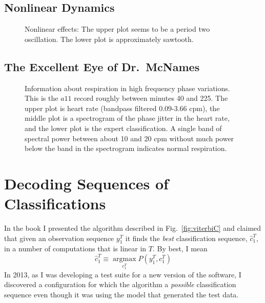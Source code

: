 \documentclass[prelim,showlabels]{book}
\newcommand{\argmax}{\operatorname*{argmax}}
\begin{document}
\addtocounter{subsection}{1}
\subsection{Nonlinear Dynamics}
\label{sec:NLD}

\begin{figure}
  \caption[Nonlinear effects]%
  {Nonlinear effects: The upper plot seems to be a period two
    oscillation.  The lower plot is approximately sawtooth.}
  \label{fig:ApneaNLD}
\end{figure}

\subsection{The Excellent Eye of Dr.\ McNames}
\label{sec:mcnames}

\begin{figure}
  \caption[Information about respiration in high
  frequency phase variations]%
  {Information about respiration in high frequency phase variations.
    This is the $a11$ record roughly between minutes 40 and 225.  The
    upper plot is heart rate (bandpass filtered 0.09-3.66 cpm), the
    middle plot is a spectrogram of the phase jitter in the heart
    rate, and the lower plot is the expert classification.  A single
    band of spectral power between about 10 and 20 cpm without much
    power below the band in the spectrogram indicates normal
    respiration.}
  \label{fig:sgram}
\end{figure}
\afterpage{\clearpage} %
\newpage
\section{Decoding Sequences of Classifications}
\label{sec:V4Class}

In the book I presented the algorithm described
in Fig.~\ref{fig:viterbiC} and claimed that given an observation sequence
$y_1^T$ it finds the \emph{best} classification sequence, $\hat c_1^T$,
in a number of computations that is linear in $T$.  By best, I mean
\begin{equation*}
  \hat c_1^T \equiv \argmax_{c_1^T} P(y_1^T,c_1^T)
\end{equation*}
In 2013, as I was developing a test suite for a new version of the
software, I discovered a configuration for which the algorithm
a \emph{possible} classification sequence even though it was using the
model that generated the test data.
\end{document}
